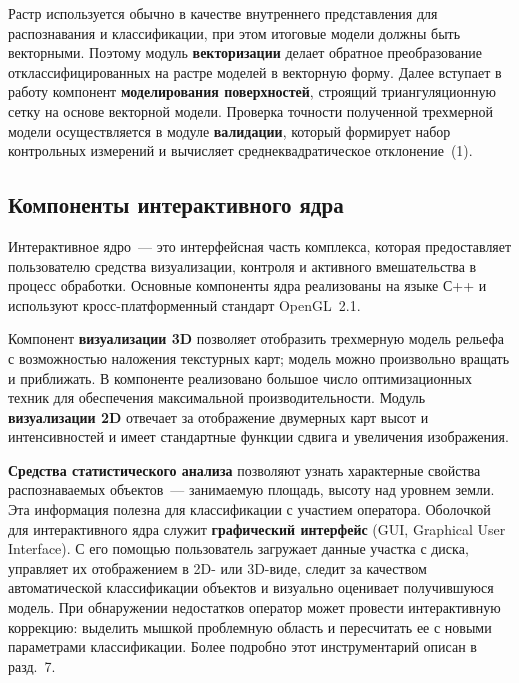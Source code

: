 \begin{multicols}{2}
   Растр используется обычно в качестве внутреннего представления для 
распознавания и классификации, при этом итоговые модели должны быть 
векторными. Поэтому модуль \textbf{векторизации} делает обратное 
преобразование отклассифицированных на растре моделей в векторную форму. 
Далее вступает в работу компонент \textbf{моделирования поверхностей}, 
строящий триангуляционную сетку на основе векторной модели. Проверка 
точности полученной трехмерной модели осуществляется в модуле 
\textbf{валидации}, который формирует набор контрольных измерений и 
вычисляет среднеквадратическое отклонение~(1).
   

\subsection{Компоненты интерактивного ядра} %
   
   Интерактивное ядро~--- это интерфейсная часть комплекса, которая 
предоставляет пользователю средства визуализации, контроля и активного 
вмешательства в процесс обработки. Основные компоненты ядра реализованы 
на языке С++ и используют кросс-платформенный стандарт \mbox{OpenGL~2.1}.
   
   Компонент \textbf{визуализации 3D} позволяет отобразить трехмерную 
модель рельефа с возможностью наложения текстурных карт; модель можно 
произвольно вращать и приближать. В компоненте реализовано большое число 
оптимизационных техник для обеспечения максимальной про\-из\-во\-ди\-тель\-ности. 
Модуль \textbf{визуализации 2D} отвечает за отоб\-ра\-же\-ние двумерных карт 
высот и ин\-тен\-сив\-ностей и имеет стандартные функции сдвига и увеличения 
изображения.
   
   \textbf{Средства статистического анализа} позволяют узнать характерные 
свойства распознаваемых объектов~--- занимаемую площадь, высоту над 
уровнем земли. Эта информация полезна для классификации с участием 
оператора. Оболочкой для интерактивного ядра служит \textbf{графический 
интерфейс} (GUI, Graphical User Interface). С его помощью пользователь загружает данные участка с 
диска, управляет их отображением в 2D- или 3D-виде, следит за качеством 
автоматической классификации объектов и визуально оценивает получившуюся 
модель. При обнаружении недостатков оператор может про\-вес\-ти 
интерактивную коррекцию: выделить мышкой проблемную область и 
пересчитать ее с новыми параметрами классификации. Более подробно этот 
инструментарий описан в разд.~7.
   

\end{multicols}
